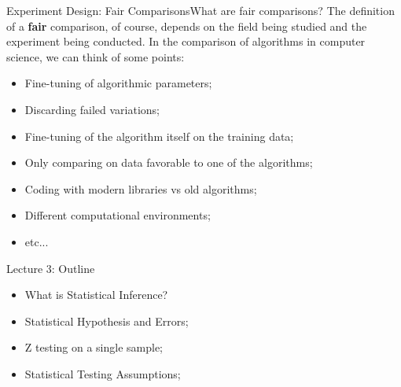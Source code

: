 \begin{frame}{Experiment Design: Fair Comparisons}{What are fair comparisons?}
  The definition of a {\bf fair} comparison, of course, depends on the field being studied and the experiment being conducted. In the comparison of algorithms in computer science, we can think of some points:
  \begin{itemize}
    \item Fine-tuning of algorithmic parameters;
    \item Discarding failed variations;\medskip
    \item Fine-tuning of the algorithm itself on the training data;
    \item Only comparing on data favorable to one of the algorithms;\medskip
    \item Coding with modern libraries vs old algorithms;
    \item Different computational environments;
    \item etc...
  \end{itemize}
\end{frame}

\begin{frame}{Lecture 3: Outline}
  \begin{itemize}
    \item What is Statistical Inference?\bigskip
    \item Statistical Hypothesis and Errors;\bigskip
    \item Z testing on a single sample;\bigskip
    \item Statistical Testing Assumptions;\bigskip
  \end{itemize}
\end{frame}

